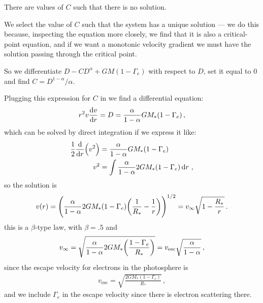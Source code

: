 \documentclass[main.tex]{subfiles}
\begin{document}
There are values of \(C\) such that there is no solution. 

We select the value of \(C\) such that the system has a unique solution --- we do this because, inspecting the equation more closely, we find that it is also a critical-point equation, and if we want a monotonic velocity gradient we must have the solution passing through the critical point.


So we differentiate \(D - C D^{\alpha } + GM (1-\Gamma_{e})\) with respect to \(D\), set it equal to \(0\) and find \(C = D^{1-\alpha } / \alpha \).

Plugging this expression for \(C\) in we find a differential equation: 
%
\begin{align}
  r^2 v \dv{v}{r} = D = \frac{\alpha }{1 - \alpha } GM_{*} (1-\Gamma_{e})
\,,
\end{align}
%
which can be solved by direct integration if we express it like: 
%
\begin{subequations}
\begin{align}
\frac{1}{2} \dv{}{r} \qty(v^2)
&= \frac{\alpha }{1-\alpha } GM_{*} (1 - \Gamma_{e}) \\
v^2 &= \int  \frac{\alpha }{1-\alpha } 2GM_{*} (1 - \Gamma_{e}) \dd{r} 
\,,
\end{align}
\end{subequations}
%
so the solution is 
%
\begin{align}
  v(r) = \qty(\frac{\alpha }{1-\alpha } 2GM_{*} \qty(1-\Gamma_{e} ) \qty(\frac{1}{R_{*}} - \frac{1}{r}))^{1/2}
  = v_{ \infty } \sqrt{1 - \frac{R_{*}}{r}}
\,. 
\end{align}
%
this is a \(\beta \)-type law, with \(\beta = \num{.5}\) and 
%
\begin{align}
  v_{ \infty } = \sqrt{\frac{\alpha }{1-\alpha } 2GM_{*} \qty(\frac{1-\Gamma_{e} }{R_{*}})}
  = v _{\text{esc}} \sqrt{\frac{\alpha }{1 - \alpha }}
\,,
\end{align}
%
since the escape velocity for electrons in the photosphere is 
%
\begin{align}
  v _{\text{esc}} = \sqrt{\frac{2 G M_{*} (1 - \Gamma_{e })}{R_{*}}}
\,,
\end{align}
%
and we include \(\Gamma_{e} \) in the escape velocity since there is electron scattering there.
\end{document}
